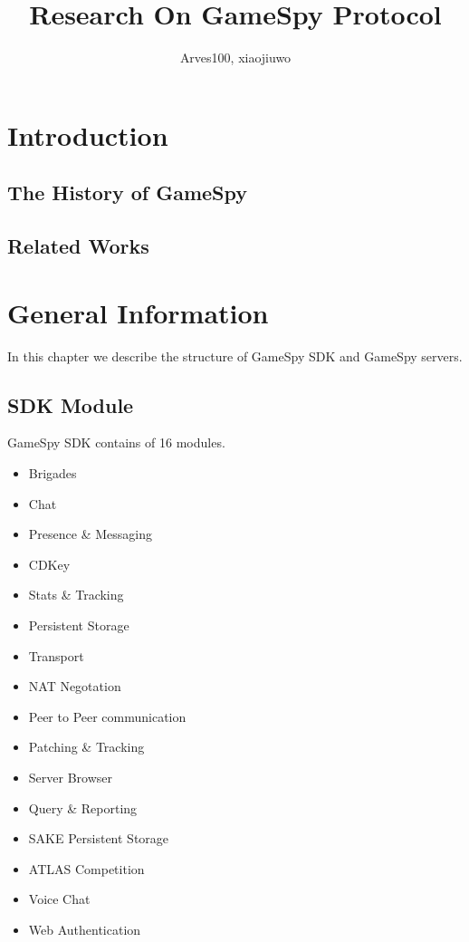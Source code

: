 \documentclass[oneside,titlepage,a4paper]{Definition/retrospy} %
\begin{document}
\title{\Huge\textbf{Research On GameSpy Protocol}} 
\author{Arves100, xiaojiuwo}



\maketitle  %

\tableofcontents  %

\chapter{Introduction}

\section{The History of GameSpy}

\section{Related Works}


\chapter{General Information}
In this chapter we describe the structure of GameSpy SDK and GameSpy servers.
\section{SDK Module}
GameSpy SDK contains of  16 modules.
	\begin{itemize}
		\item Brigades
		\item Chat
		\item Presence \& Messaging
		\item CDKey
		\item Stats \& Tracking
		\item Persistent Storage
		\item Transport
		\item NAT Negotation
		\item Peer to Peer communication
		\item Patching \& Tracking
		\item Server Browser
		\item Query \& Reporting
		\item SAKE Persistent Storage
		\item ATLAS Competition
		\item Voice Chat
		\item Web Authentication
	\end{itemize}
\end{document}
